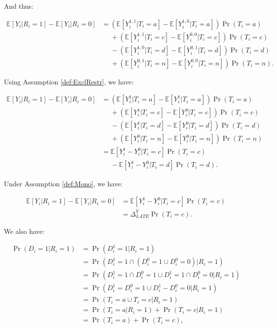 \documentclass[]{book}
\newcommand{\esp}[1]{\mathbb{E}[ #1 ]}
\theoremstyle{definition}
\theoremstyle{definition}
\theoremstyle{definition}
\theoremstyle{remark}
\begin{document}
And thus:

\begin{align*}
\esp{Y_i|R_i=1}-\esp{Y_i|R_i=0} & = (\esp{Y_i^{1,1}|T_i=a}-\esp{Y_i^{1,0}|T_i=a})\Pr(T_i=a)\\
                                & \phantom{=}+ (\esp{Y_i^{1,1}|T_i=c}-\esp{Y_i^{0,0}|T_i=c})\Pr(T_i=c) \\
                                            & \phantom{=} - (\esp{Y_i^{1,0}|T_i=d}-\esp{Y_i^{0,1}|T_i=d})\Pr(T_i=d)\\
                                            & \phantom{=} + (\esp{Y_i^{0,1}|T_i=n}-\esp{Y_i^{0,0}|T_i=n})\Pr(T_i=n).
\end{align*}

Using Assumption \ref{def:ExclRestr}, we have:

\begin{align*}
\esp{Y_i|R_i=1}-\esp{Y_i|R_i=0} & = (\esp{Y_i^{1}|T_i=a}-\esp{Y_i^{1}|T_i=a})\Pr(T_i=a)\\
                                & \phantom{=}+ (\esp{Y_i^{1}|T_i=c}-\esp{Y_i^{0}|T_i=c})\Pr(T_i=c) \\
                                            & \phantom{=} - (\esp{Y_i^{1}|T_i=d}-\esp{Y_i^{0}|T_i=d})\Pr(T_i=d)\\
                                            & \phantom{=} + (\esp{Y_i^{0}|T_i=n}-\esp{Y_i^{0}|T_i=n})\Pr(T_i=n)\\
                                            & = \esp{Y_i^{1}-Y_i^{0}|T_i=c}\Pr(T_i=c) \\
                                            & \phantom{=} - \esp{Y_i^{1}-Y_i^{0}|T_i=d}\Pr(T_i=d).
\end{align*}

Under Assumption \ref{def:Mono}, we have:

\begin{align*}
\esp{Y_i|R_i=1}-\esp{Y_i|R_i=0} &  = \esp{Y_i^{1}-Y_i^{0}|T_i=c}\Pr(T_i=c)\\
                                 & = \Delta^Y_{LATE}\Pr(T_i=c).
\end{align*}

We also have:

\begin{align*}
\Pr(D_i=1|R_i=1) & = \Pr(D^1_i=1|R_i=1)\\
                & =  \Pr(D^1_i=1\cap (D_i^0=1\cup D_i^0=0) |R_i=1)\\
                & =  \Pr(D^1_i=1\cap D_i^0=1\cup D^1_i=1\cap D_i^0=0 |R_i=1)\\
                & =  \Pr(D^1_i=D_i^0=1\cup D^1_i-D_i^0=0 |R_i=1)\\
                & =  \Pr(T_i=a\cup T_i=c |R_i=1)\\
               & =  \Pr(T_i=a|R_i=1)+\Pr(T_i=c|R_i=1)\\
               & =  \Pr(T_i=a)+\Pr(T_i=c),
\end{align*}
\end{document}
